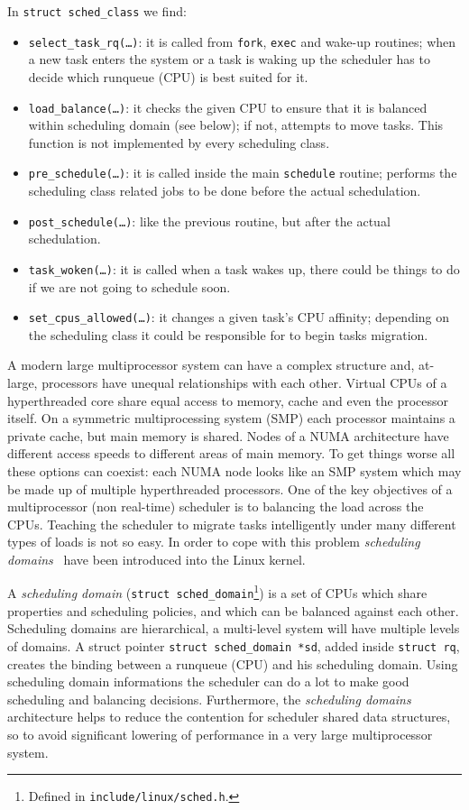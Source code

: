 In \texttt{struct sched\_class} we find:
\begin{itemize}
\item \texttt{select\_task\_rq(\dots)}: it is called from \texttt{fork},
  \texttt{exec} and wake-up routines; when a new task enters the
  system or a task is waking up the scheduler has to decide which
  runqueue (CPU) is best suited for it.
\item \texttt{load\_balance(\dots)}: it checks the given CPU to ensure
  that it is balanced within scheduling domain (see below); if not,
  attempts to move tasks. This function is not implemented by every
  scheduling class.
\item \texttt{pre\_schedule(\dots)}: it is called inside the main
  \texttt{schedule} routine; performs the scheduling class related
  jobs to be done before the actual schedulation.
\item \texttt{post\_schedule(\dots)}: like the previous routine, but
  after the actual schedulation.
\item \texttt{task\_woken(\dots)}: it is called when a task wakes up,
  there could be things to do if we are not going to schedule soon.
\item \texttt{set\_cpus\_allowed(\dots)}: it changes a given task's
  CPU affinity; depending on the scheduling class it could be
  responsible for to begin tasks migration.
\end{itemize}

A modern large multiprocessor system can have a complex structure and,
at-large, processors have unequal relationships with each
other. Virtual CPUs of a hyperthreaded core share equal access to
memory, cache and even the processor itself. On a symmetric
multiprocessing system (SMP) each processor maintains a private cache,
but main memory is shared. Nodes of a NUMA architecture have different
access speeds to different areas of main memory. To get things worse
all these options can coexist: each NUMA node looks like an SMP system
which may be made up of multiple hyperthreaded processors. One of the
key objectives of a multiprocessor (non real-time) scheduler is to
balancing the load across the CPUs. Teaching the scheduler to migrate
tasks intelligently under many different types of loads is not so
easy. In order to cope with this problem \emph{scheduling
  domains}~\cite{corbet04} have been introduced into the
Linux kernel.

A \emph{scheduling domain} (\texttt{struct
  sched\_domain}\footnote{Defined in \texttt{include/linux/sched.h}.})
is a set of CPUs which share properties and scheduling policies, and
which can be balanced against each other. Scheduling domains are
hierarchical, a multi-level system will have multiple levels of
domains. A struct pointer \texttt{struct sched\_domain *sd}, added
inside \texttt{struct rq}, creates the binding between a runqueue
(CPU) and his scheduling domain. Using scheduling domain informations
the scheduler can do a lot to make good scheduling and balancing
decisions. Furthermore, the \emph{scheduling domains} architecture
helps to reduce the contention for scheduler shared data structures,
so to avoid significant lowering of performance in a very large
multiprocessor system.

